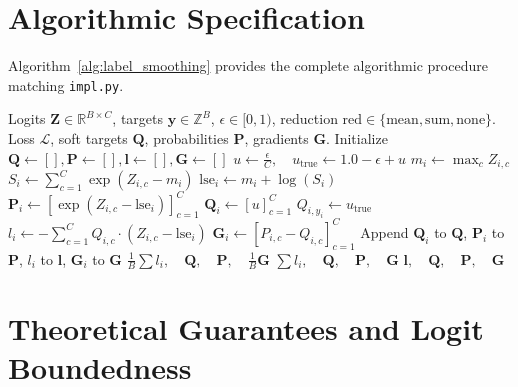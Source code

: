 \documentclass[11pt]{article}
\begin{document}
\section{Algorithmic Specification}
\label{sec:algorithm}

Algorithm~\ref{alg:label_smoothing} provides the complete algorithmic procedure matching \texttt{impl.py}.

\begin{algorithm}[H]
\caption{Label Smoothing Regularization Forward and Gradient Evaluation}
\label{alg:label_smoothing}
\begin{algorithmic}[1]
\Require Logits $\mathbf{Z} \in \mathbb{R}^{B \times C}$, targets $\mathbf{y} \in \mathbb{Z}^B$, $\epsilon \in [0, 1)$, reduction $\mathrm{red} \in \{\text{mean}, \text{sum}, \text{none}\}$.
\Ensure Loss $\mathcal{L}$, soft targets $\mathbf{Q}$, probabilities $\mathbf{P}$, gradients $\mathbf{G}$.
\State Initialize $\mathbf{Q} \gets [], \mathbf{P} \gets [], \mathbf{l} \gets [], \mathbf{G} \gets []$
\State $u \gets \frac{\epsilon}{C}, \quad u_{\mathrm{true}} \gets 1.0 - \epsilon + u$
    \State $m_i \gets \max_{c} Z_{i, c}$
    \State $S_i \gets \sum_{c=1}^C \exp(Z_{i, c} - m_i)$
    \State $\mathrm{lse}_i \gets m_i + \log(S_i)$
    \State $\mathbf{P}_i \gets [\exp(Z_{i, c} - \mathrm{lse}_i)]_{c=1}^C$
    \State $\mathbf{Q}_i \gets [u]_{c=1}^C$
    \State $Q_{i, y_i} \gets u_{\mathrm{true}}$
    \State $l_i \gets -\sum_{c=1}^C Q_{i, c} \cdot (Z_{i, c} - \mathrm{lse}_i)$
    \State $\mathbf{G}_i \gets [P_{i, c} - Q_{i, c}]_{c=1}^C$
    \State Append $\mathbf{Q}_i$ to $\mathbf{Q}$, $\mathbf{P}_i$ to $\mathbf{P}$, $l_i$ to $\mathbf{l}$, $\mathbf{G}_i$ to $\mathbf{G}$
\EndFor
{}
    \State \Return $\frac{1}{B}\sum l_i, \quad \mathbf{Q}, \quad \mathbf{P}, \quad \frac{1}{B}\mathbf{G}$
    \State \Return $\sum l_i, \quad \mathbf{Q}, \quad \mathbf{P}, \quad \mathbf{G}$
\Else
    \State \Return $\mathbf{l}, \quad \mathbf{Q}, \quad \mathbf{P}, \quad \mathbf{G}$
\EndIf
\end{algorithmic}
\end{algorithm}

\section{Theoretical Guarantees and Logit Boundedness}
\label{sec:guarantees}
\end{document}
